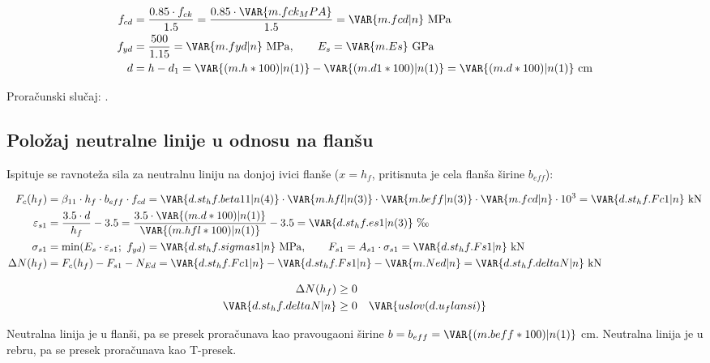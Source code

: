 \begin{align*}
f_{cd} &= \frac{0.85 \cdot f_{ck}}{1.5} = \frac{0.85 \cdot \VAR{m.fck_MPA}}{1.5} = \VAR{m.fcd|n} \ \mathrm{MPa} \\
f_{yd} &= \frac{500}{1.15} = \VAR{m.fyd|n} \ \mathrm{MPa}, \qquad E_s = \VAR{m.Es} \ \mathrm{GPa} \\
d &= h - d_1 = \VAR{(m.h*100)|n(1)} - \VAR{(m.d1*100)|n(1)} = \VAR{(m.d*100)|n(1)} \ \mathrm{cm}
\end{align*}

Proračunski slučaj: \textbf{}.

\subsection{Položaj neutralne linije u odnosu na flanšu}

Ispituje se ravnoteža sila za neutralnu liniju na donjoj ivici flanše ($x = h_f$, pritisnuta je cela flanša širine $b_{eff}$):

\begin{align*}
F_{c}(h_f) &= \beta_{11} \cdot h_f \cdot b_{eff} \cdot f_{cd} = \VAR{d.st_hf.beta11|n(4)} \cdot \VAR{m.hfl|n(3)} \cdot \VAR{m.beff|n(3)} \cdot \VAR{m.fcd|n} \cdot 10^3 = \VAR{d.st_hf.Fc1|n} \ \mathrm{kN} \\
\varepsilon_{s1} &= \frac{3.5 \cdot d}{h_f} - 3.5 = \frac{3.5 \cdot \VAR{(m.d*100)|n(1)}}{\VAR{(m.hfl*100)|n(1)}} - 3.5 = \VAR{d.st_hf.es1|n(3)} \ \text{‰} \\
\sigma_{s1} &= \min(E_s \cdot \varepsilon_{s1};\ f_{yd}) = \VAR{d.st_hf.sigmas1|n} \ \mathrm{MPa}, \qquad F_{s1} = A_{s1} \cdot \sigma_{s1} = \VAR{d.st_hf.Fs1|n} \ \mathrm{kN} \\
\Delta N(h_f) &= F_c(h_f) - F_{s1} - N_{Ed} = \VAR{d.st_hf.Fc1|n} - \VAR{d.st_hf.Fs1|n} - \VAR{m.Ned|n} = \VAR{d.st_hf.deltaN|n} \ \mathrm{kN}
\end{align*}

\begin{align*}
\Delta N(h_f) &\geq 0 \\
\VAR{d.st_hf.deltaN|n} &\geq 0 \quad \VAR{uslov(d.u_flansi)}
\end{align*}

Neutralna linija je u flanši, pa se presek proračunava kao pravougaoni širine $b = b_{eff} = \VAR{(m.beff*100)|n(1)}$ cm.
Neutralna linija je u rebru, pa se presek proračunava kao T-presek.

